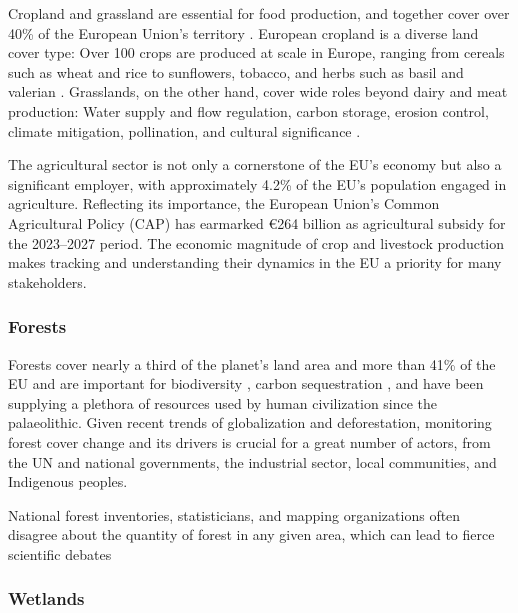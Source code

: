         Cropland and grassland are essential for food production, and together cover over 40\% of the European Union's territory \citep{eurostat2021land}. European cropland is a diverse land cover type: Over 100 crops are produced at scale in Europe, ranging from cereals such as wheat and rice to sunflowers, tobacco, and herbs such as basil and valerian \citep{eurostat2023agricultural}. Grasslands, on the other hand, cover wide roles beyond dairy and meat production: Water supply and flow regulation, carbon storage, erosion control, climate mitigation, pollination, and cultural significance \citep{bengtsson2019grasslands}. 
        
        The agricultural sector is not only a cornerstone of the EU's economy but also a significant employer, with approximately 4.2\% of the EU's population engaged in agriculture. Reflecting its importance, the European Union's Common Agricultural Policy (CAP) has earmarked €264 billion as agricultural subsidy for the 2023–2027 period. The economic magnitude of crop and livestock production makes tracking and understanding their dynamics in the EU a priority for many stakeholders.

    \subsubsection*{Forests}

        Forests cover nearly a third of the planet's land area \citep{fao2022,banskota2014forest} and more than 41\% of the EU \citep{eurostat2021land} and are important for biodiversity \citep{cazzolla2022number}, carbon sequestration \citep{ipcc2021}, and have been supplying a plethora of resources used by human civilization since the palaeolithic. Given recent trends of globalization and deforestation, monitoring forest cover change and its drivers is crucial \citep{sy2019tropical,masolele2024mapping} for a great number of actors, from the UN and national governments, the industrial sector, local communities, and Indigenous peoples.

        National forest inventories, statisticians, and mapping organizations often disagree about the quantity of forest in any given area, which can lead to fierce scientific debates \citep{picard2021recent, korhonen2020new, palahi2021concerns, rossi2019assessing}
    
    \subsubsection*{Wetlands}

